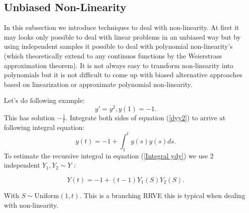 \documentclass[a4paper,12pt]{article}
\begin{document}
\subsection{Unbiased Non-Linearity}
In this subsection we introduce techniques to deal with non-linearity.
At first it may looks only possible to deal with linear problems in an unbiased way but by using
independent samples it possible to deal with polynomial non-linearity's (which theoretically extend
to any continuos functions by the Weierstrass approximation theorem).  It is not always easy to
transform non-linearity into polynomials but it is not difficult to come up with
biased alternative approaches based on linearization or approximate polynomial non-linearity.


\begin{example}[$y'=y^{2}$]
    Let's do following example:
    \begin{equation} \label{dyy2}
        y'= y^2,y(1)=-1.
    \end{equation}
    This has solution $-\frac{1}{t}$. Integrate both sides of
    equation (\ref{dyy2}) to arrive at following integral equation:
    \begin{equation} \label{Integral dyy2}
        y(t) = -1 + \int_{1}^{t} y(s) y(s) ds .
    \end{equation}
    To estimate the recursive integral in equation (\ref{Integral ydy}) we use $2$
    independent $Y_{1},Y_{2}\sim Y$ :

    \begin{equation} \label{RRVE yy2}
        Y(t) = -1 + (t-1) Y_{1}(S) Y_{2}(S).
    \end{equation}

    With $S \sim \text{Uniform}(1,t)$. This is a branching RRVE this is
    typical when dealing with non-linearity.
\end{example}

\vspace*{0.2cm}
\begin{pythonn}[$y'=y^{2}$]
\end{pythonn}
\end{document}
